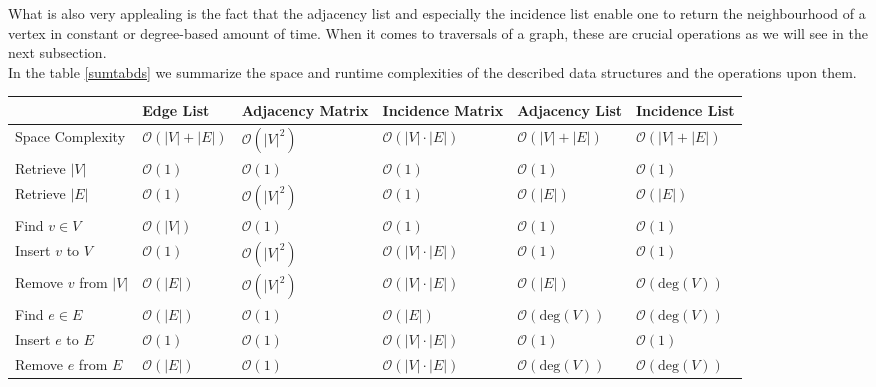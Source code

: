         What is also very applealing is the fact that the adjacency list and especially the incidence list enable one to return the neighbourhood of a vertex in constant or degree-based amount of time. 
        When it comes to traversals of a graph, these are crucial operations as we will see in the next subsection. \\
        
        In the table \ref{sumtabds} we summarize the space and runtime complexities of the described data structures and the operations upon them. 
                
        \newpage
        \begin{landscape}
            \begin{longtable}[c]{llllll} \toprule
            & Edge List & Adjacency Matrix & Incidence Matrix & Adjacency List & Incidence List \\ \midrule
            Space Complexity & $\mathcal{O}(|V| + |E|)$ & $\mathcal{O}(|V|^2)$ & $\mathcal{O}(|V| \cdot |E|)$ & $\mathcal{O}(|V| + |E|)$ & $\mathcal{O}(|V| + |E|)$ \\
            Retrieve $|V|$ & $\mathcal{O}(1)$ & $\mathcal{O}(1)$ & $\mathcal{O}(1)$ & $\mathcal{O}(1)$ & $\mathcal{O}(1)$ \\
            Retrieve $|E|$ & $\mathcal{O}(1)$ & $\mathcal{O}(|V|^2)$ & $\mathcal{O}(1)$ & $\mathcal{O}(|E|)$ & $\mathcal{O}(|E|)$ \\
            Find $v \in V$ & $\mathcal{O}(|V|)$ & $\mathcal{O}(1)$ & $\mathcal{O}(1)$ & $\mathcal{O}(1)$ & $\mathcal{O}(1)$ \\
            Insert $v$ to $V$ & $\mathcal{O}(1)$ & $\mathcal{O}(|V|^2)$ & $\mathcal{O}(|V| \cdot |E|)$ & $\mathcal{O}(1)$ & $\mathcal{O}(1)$ \\
            Remove $v$ from $|V|$ & $\mathcal{O}(|E|)$ & $\mathcal{O}(|V|^2)$ & $\mathcal{O}(|V| \cdot |E|)$ & $\mathcal{O}(|E|)$ & $\mathcal{O}(\text{deg}(V))$ \\
            Find $e \in E$ & $\mathcal{O}(|E|)$ & $\mathcal{O}(1)$ & $\mathcal{O}(|E|)$ & $\mathcal{O}(\text{deg}(V))$ & $\mathcal{O}(\text{deg}(V))$ \\
            Insert $e$ to $E$ & $\mathcal{O}(1)$ & $\mathcal{O}(1)$ & $\mathcal{O}(|V| \cdot |E|)$ & $\mathcal{O}(1)$ & $\mathcal{O}(1)$ \\
            Remove $e$ from $E$ & $\mathcal{O}(|E|)$ & $\mathcal{O}(1)$ & $\mathcal{O}(|V| \cdot |E|)$ & $\mathcal{O}(\text{deg}(V))$ & $\mathcal{O}(\text{deg}(V))$ \\

\end{longtable}
\end{landscape}
